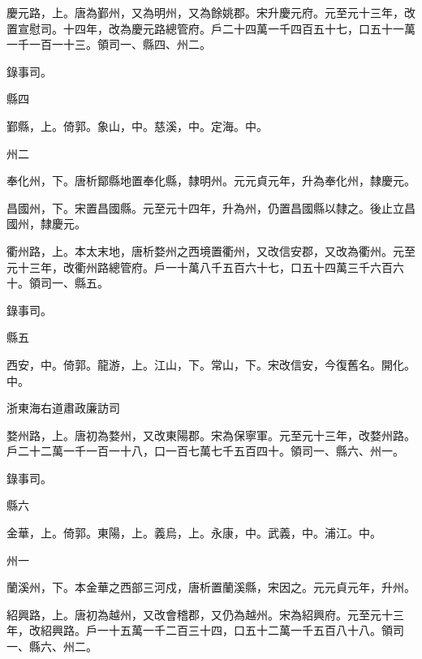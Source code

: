 \begin{pinyinscope}
 慶元路，上。唐為鄞州，又為明州，又為餘姚郡。宋升慶元府。元至元十三年，改置宣慰司。十四年，改為慶元路總管府。戶二十四萬一千四百五十七，口五十一萬一千一百一十三。領司一、縣四、州二。



 錄事司。



 縣四



 鄞縣，上。倚郭。象山，中。慈溪，中。定海。中。



 州二



 奉化州，下。唐析鄮縣地置奉化縣，隸明州。元元貞元年，升為奉化州，隸慶元。



 昌國州，下。宋置昌國縣。元至元十四年，升為州，仍置昌國縣以隸之。後止立昌國州，隸慶元。



 衢州路，上。本太末地，唐析婺州之西境置衢州，又改信安郡，又改為衢州。元至元十三年，改衢州路總管府。戶一十萬八千五百六十七，口五十四萬三千六百六十。領司一、縣五。



 錄事司。



 縣五



 西安，中。倚郭。龍游，上。江山，下。常山，下。宋改信安，今復舊名。開化。中。



 浙東海右道肅政廉訪司



 婺州路，上。唐初為婺州，又改東陽郡。宋為保寧軍。元至元十三年，改婺州路。戶二十二萬一千一百一十八，口一百七萬七千五百四十。領司一、縣六、州一。



 錄事司。



 縣六



 金華，上。倚郭。東陽，上。義烏，上。永康，中。武義，中。浦江。中。



 州一



 蘭溪州，下。本金華之西部三河戍，唐析置蘭溪縣，宋因之。元元貞元年，升州。



 紹興路，上。唐初為越州，又改會稽郡，又仍為越州。宋為紹興府。元至元十三年，改紹興路。戶一十五萬一千二百三十四，口五十二萬一千五百八十八。領司一、縣六、州二。




\end{pinyinscope}
